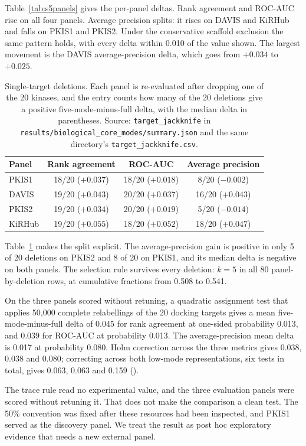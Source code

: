 Table~\ref{tab:s5panels} gives the per-panel deltas. Rank agreement and ROC-AUC rise on all four
panels. Average precision splits: it rises on DAVIS and KiRHub and falls on PKIS1 and PKIS2.
Under the conservative scaffold exclusion the same pattern holds, with every delta within 0.010
of the value shown. The largest movement is the DAVIS average-precision delta, which goes from
$+0.034$ to $+0.025$.

\begin{table}[htbp]
\centering
\caption{Single-target deletions. Each panel is re-evaluated after dropping one of the 20
kinases, and the entry counts how many of the 20 deletions give a positive
five-mode-minus-full delta, with the median delta in parentheses. Source:
\texttt{target\_jackknife} in
\texttt{results/biological\_core\_modes/summary.json} and the same directory's
\texttt{target\_jackknife.csv}.}
\label{tab:s5jack}
\small
\begin{tabular}{lccc}
\toprule
Panel & Rank agreement & ROC-AUC & Average precision \\
\midrule
PKIS1 & 18/20 ($+0.037$) & 18/20 ($+0.018$) & 8/20 ($-0.002$) \\
DAVIS & 19/20 ($+0.043$) & 20/20 ($+0.037$) & 16/20 ($+0.043$) \\
PKIS2 & 19/20 ($+0.034$) & 20/20 ($+0.019$) & 5/20 ($-0.014$) \\
KiRHub & 19/20 ($+0.055$) & 18/20 ($+0.052$) & 18/20 ($+0.047$) \\
\bottomrule
\end{tabular}
\end{table}

Table~\ref{tab:s5jack} makes the split explicit. The average-precision gain is positive in only 5
of 20 deletions on PKIS2 and 8 of 20 on PKIS1, and its median delta is negative on both panels.
The selection rule survives every deletion: $k=5$ in all 80 panel-by-deletion rows, at cumulative
fractions from 0.508 to 0.541.

On the three panels scored without retuning, a quadratic assignment test that applies 50{,}000
complete relabellings of the 20 docking targets gives a mean five-mode-minus-full delta of 0.045
for rank agreement at one-sided probability 0.013, and 0.039 for ROC-AUC at probability 0.013.
The average-precision mean delta is 0.017 at probability 0.080. Holm correction across the three
metrics gives 0.038, 0.038 and 0.080; correcting across both low-mode representations, six tests
in total, gives 0.063, 0.063 and 0.159
().

The trace rule read no experimental value, and the three evaluation panels were scored without
retuning it. That does not make the comparison a clean test. The 50\% convention was fixed after
these resources had been inspected, and PKIS1 served as the discovery panel. We treat the result
as post hoc exploratory evidence that needs a new external panel.
